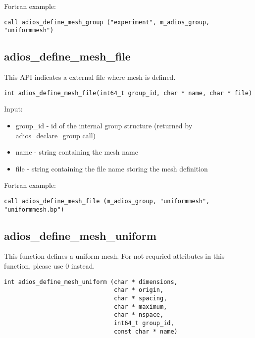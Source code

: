 Fortran example:
\begin{lstlisting}[alsolanguage=Fortran,caption={},label={}]
call adios_define_mesh_group ("experiment", m_adios_group, "uniformmesh")
\end{lstlisting}


\subsection{adios\_define\_mesh\_file}
This API indicates a external file where mesh is defined.

\begin{lstlisting}[alsolanguage=C,caption={},label={}]
int adios_define_mesh_file(int64_t group_id, char * name, char * file)
\end{lstlisting}

Input:
\begin{itemize}
\item group\_id - id of the internal group structure (returned by adios\_declare\_group call)
\item name - string containing the mesh name
\item file - string containing the file name storing the mesh definition
\end{itemize}

Fortran example:
\begin{lstlisting}[alsolanguage=Fortran,caption={},label={}]
call adios_define_mesh_file (m_adios_group, "uniformmesh", "uniformmesh.bp")
\end{lstlisting}


\subsection{adios\_define\_mesh\_uniform}
This function defines a uniform mesh. For not requried attributes in this function, please use 0 instead.

\begin{lstlisting}[alsolanguage=Fortran,caption={},label={}]
int adios_define_mesh_uniform (char * dimensions,
                               char * origin,
                               char * spacing,
                               char * maximum,
                               char * nspace,
                               int64_t group_id,
                               const char * name)
\end{lstlisting}

